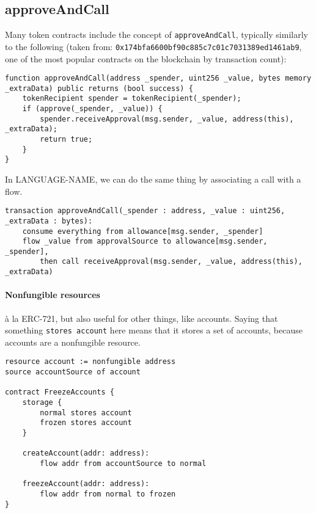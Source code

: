 \documentclass[10pt]{article}
\newcommand{\langName}{LANGUAGE-NAME\xspace}
\begin{document}
\subsection{approveAndCall}

Many token contracts include the concept of \lstinline{approveAndCall}, typically similarly to the following (taken from: \lstinline{0x174bfa6600bf90c885c7c01c7031389ed1461ab9}, one of the most popular contracts on the blockchain by transaction count):
\begin{lstlisting}
function approveAndCall(address _spender, uint256 _value, bytes memory _extraData) public returns (bool success) {
    tokenRecipient spender = tokenRecipient(_spender);
    if (approve(_spender, _value)) {
        spender.receiveApproval(msg.sender, _value, address(this), _extraData);
        return true;
    }
}
\end{lstlisting}

In \langName, we can do the same thing by associating a call with a flow.
\begin{lstlisting}
transaction approveAndCall(_spender : address, _value : uint256, _extraData : bytes):
    consume everything from allowance[msg.sender, _spender]
    flow _value from approvalSource to allowance[msg.sender, _spender],
        then call receiveApproval(msg.sender, _value, address(this), _extraData)
\end{lstlisting}

\paragraph{Nonfungible resources} \`a la ERC-721, but also useful for other things, like accounts.
Saying that something \lstinline{stores account} here means that it stores a set of accounts, because accounts are a nonfungible resource.
\begin{lstlisting}
resource account := nonfungible address
source accountSource of account

contract FreezeAccounts {
    storage {
        normal stores account
        frozen stores account
    }

    createAccount(addr: address):
        flow addr from accountSource to normal

    freezeAccount(addr: address):
        flow addr from normal to frozen
}
\end{lstlisting}
\end{document}
